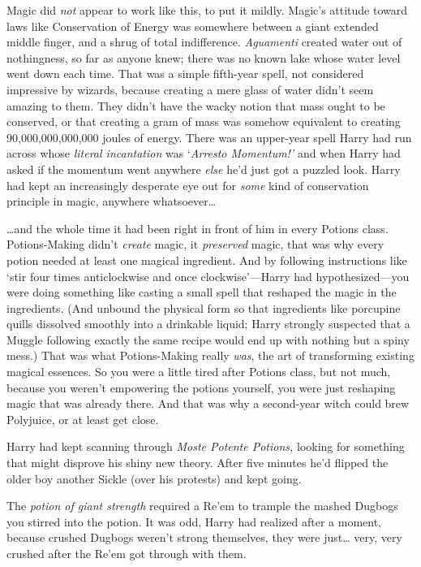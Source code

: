 Magic did \emph{not} appear to work like this, to put it mildly. Magic's attitude toward laws like Conservation of Energy was somewhere between a giant extended middle finger, and a shrug of total indifference. \emph{Aguamenti} created water out of nothingness, so far as anyone knew; there was no known lake whose water level went down each time. That was a simple fifth-year spell, not considered impressive by wizards, because creating a mere glass of water didn't seem amazing to them. They didn't have the wacky notion that mass ought to be conserved, or that creating a gram of mass was somehow equivalent to creating 90,000,000,000,000 joules of energy. There was an upper-year spell Harry had run across whose \emph{literal incantation} was `\emph{Arresto Momentum!'} and when Harry had asked if the momentum went anywhere \emph{else} he'd just got a puzzled look. Harry had kept an increasingly desperate eye out for \emph{some} kind of conservation principle in magic, anywhere whatsoever{\ldots}

{\ldots}and the whole time it had been right in front of him in every Potions class. Potions-Making didn't \emph{create} magic, it \emph{preserved} magic, that was why every potion needed at least one magical ingredient. And by following instructions like `stir four times anticlockwise and once clockwise'—Harry had hypothesized—you were doing something like casting a small spell that reshaped the magic in the ingredients. (And unbound the physical form so that ingredients like porcupine quills dissolved smoothly into a drinkable liquid; Harry strongly suspected that a Muggle following exactly the same recipe would end up with nothing but a spiny mess.) That was what Potions-Making really \emph{was}, the art of transforming existing magical essences. So you were a little tired after Potions class, but not much, because you weren't empowering the potions yourself, you were just reshaping magic that was already there. And that was why a second-year witch could brew Polyjuice, or at least get close.

Harry had kept scanning through \emph{Moste Potente Potions,} looking for something that might disprove his shiny new theory. After five minutes he'd flipped the older boy another Sickle (over his protests) and kept going.

The \emph{potion of giant strength} required a Re'em to trample the mashed Dugbogs you stirred into the potion. It was odd, Harry had realized after a moment, because crushed Dugbogs weren't strong themselves, they were just{\ldots} very, very crushed after the Re'em got through with them.

